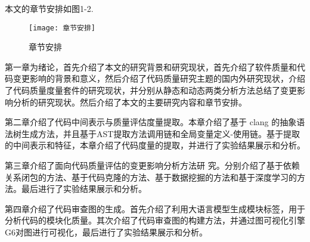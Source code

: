 本文的章节安排如图1-2.

\begin{figure}[h]
\centering
\texttt{[image: 章节安排]}
\caption{章节安排}
\end{figure}

第一章为绪论，首先介绍了本文的研究背景和研究现状，首先介绍了软件质量和代码变更影响的背景和意义，然后介绍了代码质量研究主题的国内外研究现状，介绍了代码质量度量套件的研究现状，并分别从静态和动态两类分析方法总结了变更影响分析的研究现状。然后介绍了本文的主要研究内容和章节安排。

第二章介绍了代码中间表示与质量评估度量提取。本章介绍了基于 clang 的抽象语法树生成方法，并且基于AST提取方法调用链和全局变量定义-使用链。基于提取的中间表示和特征，本章介绍了代码度量的提取，并进行了实验结果展示和分析。

第三章介绍了面向代码质量评估的变更影响分析方法研
究。分别介绍了基于依赖关系闭包的方法、基于代码克隆的方法、基于数据挖掘的方法和基于深度学习的方法。最后进行了实验结果展示和分析。

第四章介绍了代码审查图的生成。首先介绍了利用大语言模型生成模块标签，用于分析代码的模块化质量。其次介绍了代码审查图的构建方法，并通过图可视化引擎G6对图进行可视化，最后进行了实验结果展示和分析。



